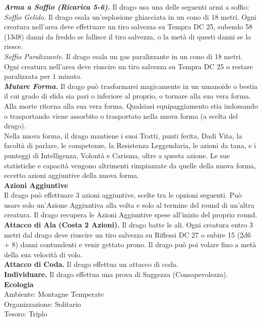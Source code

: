 \begin{multicols}{2}
\emph{\textbf{Arma a Soffio (Ricarica 5-6).}} Il drago usa una delle seguenti armi a soffio:\\
\emph{Soffio Gelido.} Il drago esala un'esplosione ghiacciata in un cono di 18 metri. Ogni creatura nell'area deve effettuare un tiro salvezza su Tempra DC  25, subendo 58 (13d8) danni da freddo se fallisce il tiro salvezza, o la metà di questi danni se lo riesce.\\
\emph{Soffio Paralizzante.} Il drago esala un gas paralizzante in un cono di 18 metri. Ogni creatura nell'area deve riuscire un tiro salvezza su Tempra DC  25 o restare paralizzata per 1 minuto.\\
\emph{\textbf{Mutare Forma.}} Il drago può trasformarsi magicamente in un umanoide o bestia il cui grado di sfida sia pari o inferiore al proprio, o tornare alla sua vera forma. Alla morte ritorna alla sua vera forma. Qualsiasi equipaggiamento stia indossando o trasportando viene assorbito o trasportato nella nuova forma (a scelta del drago).\\
Nella nuova forma, il drago mantiene i suoi Tratti, punti ferita, Dadi Vita, la facoltà di parlare, le competenze, la Resistenza Leggendaria, le azioni da tana, e i punteggi di Intelligenza, Volontà e Carisma, oltre a questa azione. Le sue statistiche e capacità vengono altrimenti rimpiazzate da quelle della nuova forma, eccetto azioni aggiuntive della nuova forma.\\
\textbf{Azioni Aggiuntive}\\
Il drago può effettuare 3 azioni aggiuntive, scelte tra le opzioni seguenti. Può usare solo un'Azione Aggiuntiva alla volta e solo al termine del round di un'altra creatura. Il drago recupera le Azioni Aggiuntive spese all'inizio del proprio round.\\
\textbf{Attacco di Ala (Costa 2 Azioni).} Il drago batte le ali. Ogni creatura entro 3 metri dal drago deve riuscire un tiro salvezza su Riflessi DC  27 o subire 15 (2d6 + 8) danni contundenti e venir gettato prono. Il drago può poi volare fino a metà della sua velocità di volo.\\
\textbf{Attacco di Coda.} Il drago effettua un attacco di coda.\\
\textbf{Individuare.} Il drago effettua una prova di Saggezza (Consapevolezza).\\
\textbf{Ecologia}\\
Ambiente: Montagne Temperate\\
Organizzazione: Solitario\\
Tesoro: Triplo\\

\end{multicols}
